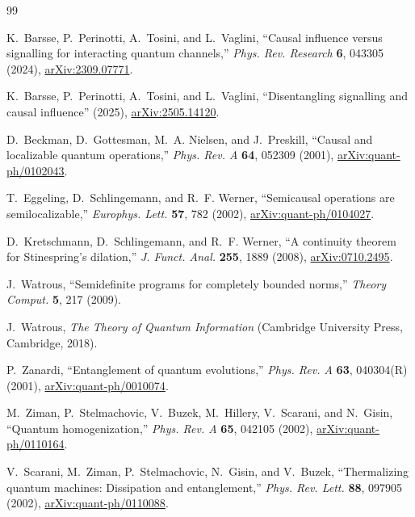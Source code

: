 \documentclass[11pt,a4paper]{article}
\theoremstyle{remark}
\begin{document}
\begin{thebibliography}{99}

K.~Barsse, P.~Perinotti, A.~Tosini, and L.~Vaglini,
``Causal influence versus signalling for interacting quantum channels,''
\emph{Phys. Rev. Research} \textbf{6}, 043305 (2024),
\href{https://arxiv.org/abs/2309.07771}{arXiv:2309.07771}.

K.~Barsse, P.~Perinotti, A.~Tosini, and L.~Vaglini,
``Disentangling signalling and causal influence'' (2025),
\href{https://arxiv.org/abs/2505.14120}{arXiv:2505.14120}.

D.~Beckman, D.~Gottesman, M.~A. Nielsen, and J.~Preskill,
``Causal and localizable quantum operations,''
\emph{Phys. Rev. A} \textbf{64}, 052309 (2001),
\href{https://arxiv.org/abs/quant-ph/0102043}{arXiv:quant-ph/0102043}.

T.~Eggeling, D.~Schlingemann, and R.~F. Werner,
``Semicausal operations are semilocalizable,''
\emph{Europhys. Lett.} \textbf{57}, 782 (2002),
\href{https://arxiv.org/abs/quant-ph/0104027}{arXiv:quant-ph/0104027}.

D.~Kretschmann, D.~Schlingemann, and R.~F. Werner,
``A continuity theorem for Stinespring's dilation,''
\emph{J. Funct. Anal.} \textbf{255}, 1889 (2008),
\href{https://arxiv.org/abs/0710.2495}{arXiv:0710.2495}.

J.~Watrous, ``Semidefinite programs for completely bounded norms,''
\emph{Theory Comput.} \textbf{5}, 217 (2009).

J.~Watrous, \emph{The Theory of Quantum Information}
(Cambridge University Press, Cambridge, 2018).

P.~Zanardi, ``Entanglement of quantum evolutions,''
\emph{Phys. Rev. A} \textbf{63}, 040304(R) (2001),
\href{https://arxiv.org/abs/quant-ph/0010074}{arXiv:quant-ph/0010074}.

M.~Ziman, P.~Stelmachovic, V.~Buzek, M.~Hillery, V.~Scarani, and N.~Gisin,
``Quantum homogenization,''
\emph{Phys. Rev. A} \textbf{65}, 042105 (2002),
\href{https://arxiv.org/abs/quant-ph/0110164}{arXiv:quant-ph/0110164}.

V.~Scarani, M.~Ziman, P.~Stelmachovic, N.~Gisin, and V.~Buzek,
``Thermalizing quantum machines: Dissipation and entanglement,''
\emph{Phys. Rev. Lett.} \textbf{88}, 097905 (2002),
\href{https://arxiv.org/abs/quant-ph/0110088}{arXiv:quant-ph/0110088}.

\end{thebibliography}
\end{document}

